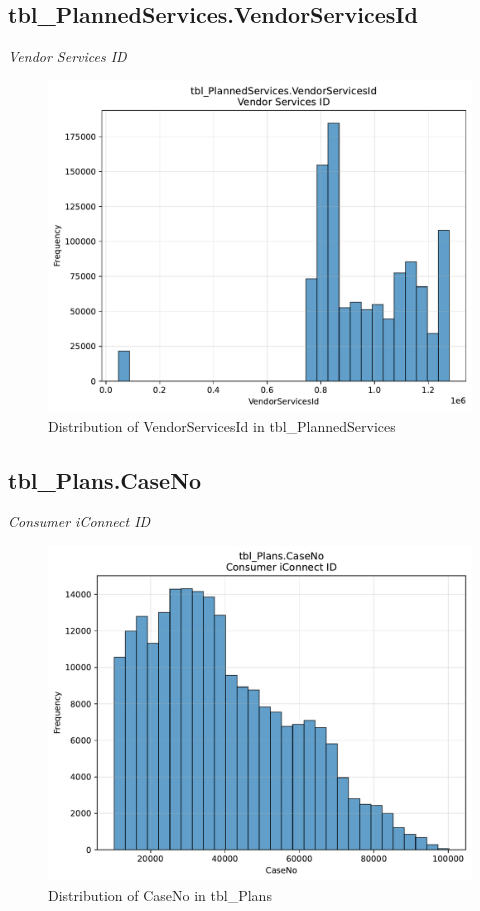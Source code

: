 \subsection{tbl\_PlannedServices.VendorServicesId}
\textit{Vendor Services ID}

\begin{figure}[htbp]
\centering
\includegraphics[width=\textwidth]{figures/dbo_tbl_PlannedServices_VendorServicesId.pdf}
\caption{Distribution of VendorServicesId in tbl\_PlannedServices}
\end{figure}\newpage

\subsection{tbl\_Plans.CaseNo}
\textit{Consumer iConnect ID}

\begin{figure}[htbp]
\centering
\includegraphics[width=\textwidth]{figures/dbo_tbl_Plans_CaseNo.pdf}
\caption{Distribution of CaseNo in tbl\_Plans}
\end{figure}\newpage

